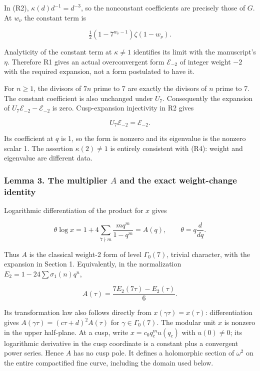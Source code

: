 \documentclass[11pt,a4paper]{article}
\begin{document}
In (R2), \(\kappa(d)d^{-1}=d^{-3}\), so the nonconstant coefficients are precisely those of \(G\). At \(w_\nu\) the constant term is

\[
\tfrac12(1-7^{w_\nu-1})\zeta(1-w_\nu).
\]

Analyticity of the constant term at \(\kappa\ne1\) identifies its limit with the manuscript's \(\eta\). Therefore R1 gives an actual overconvergent form \(\mathcal E_{-2}\) of integer weight \(-2\) with the required expansion, not a form postulated to have it.

For \(n\ge1\), the divisors of \(7n\) prime to 7 are exactly the divisors of \(n\) prime to 7. The constant coefficient is also unchanged under \(U_7\). Consequently the expansion of \(U_7\mathcal E_{-2}-\mathcal E_{-2}\) is zero. Cusp-expansion injectivity in R2 gives

\[
U_7\mathcal E_{-2}=\mathcal E_{-2}.
\tag{R4}
\]

Its coefficient at \(q\) is 1, so the form is nonzero and its eigenvalue is the nonzero scalar 1. The assertion \(\kappa(2)\ne1\) is entirely consistent with (R4): weight and eigenvalue are different data.

\hypertarget{lemma-3.-the-multiplier-a-and-the-exact-weight-change-identity}{%
\subsubsection{\texorpdfstring{Lemma 3. The multiplier \(A\) and the exact weight-change identity}{Lemma 3. The multiplier A and the exact weight-change identity}}\label{lemma-3.-the-multiplier-a-and-the-exact-weight-change-identity}}

Logarithmic differentiation of the product for \(x\) gives

\[
\theta\log x=1+4\sum_{7\nmid m}\frac{mq^m}{1-q^m}=A(q),
\qquad \theta=q\frac d{dq}.
\tag{R5}
\]

Thus \(A\) is the classical weight-2 form of level \(\Gamma_0(7)\), trivial character, with the expansion in Section 1. Equivalently, in the normalization \(E_2=1-24\sum\sigma_1(n)q^n\),

\[
A(\tau)=\frac{7E_2(7\tau)-E_2(\tau)}6.
\]

Its transformation law also follows directly from \(x(\gamma\tau)=x(\tau)\): differentiation gives \(A(\gamma\tau)=(c\tau+d)^2A(\tau)\) for \(\gamma\in\Gamma_0(7)\). The modular unit \(x\) is nonzero in the upper half-plane. At a cusp, write \(x=c_0q_c^m u(q_c)\) with \(u(0)\ne0\); its logarithmic derivative in the cusp coordinate is a constant plus a convergent power series. Hence \(A\) has no cusp pole. It defines a holomorphic section of \(\omega^2\) on the entire compactified fine curve, including the domain used below.
\end{document}
